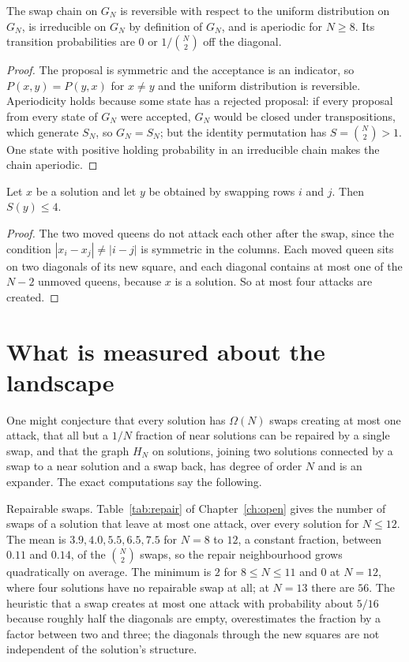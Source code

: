 \begin{lemma}
\label{lem:chainfacts}
The swap chain on $G_N$ is reversible with respect to the uniform distribution on $G_N$, is irreducible on $G_N$ by definition of $G_N$, and is aperiodic for $N \ge 8$. Its transition probabilities are $0$ or $1 / \binom{N}{2}$ off the diagonal.
\end{lemma}

\begin{proof}
The proposal is symmetric and the acceptance is an indicator, so $P(x, y) = P(y, x)$ for $x \ne y$ and the uniform distribution is reversible. Aperiodicity holds because some state has a rejected proposal: if every proposal from every state of $G_N$ were accepted, $G_N$ would be closed under transpositions, which generate $S_N$, so $G_N = S_N$; but the identity permutation has $S = \binom{N}{2} > 1$. One state with positive holding probability in an irreducible chain makes the chain aperiodic.
\end{proof}

\begin{lemma}
\label{lem:four}
Let $x$ be a solution and let $y$ be obtained by swapping rows $i$ and $j$. Then $S(y) \le 4$.
\end{lemma}

\begin{proof}
The two moved queens do not attack each other after the swap, since the condition $|x_i - x_j| \ne |i - j|$ is symmetric in the columns. Each moved queen sits on two diagonals of its new square, and each diagonal contains at most one of the $N - 2$ unmoved queens, because $x$ is a solution. So at most four attacks are created.
\end{proof}

\section{What is measured about the landscape}

One might conjecture that every solution has $\Omega(N)$ swaps creating at most one attack, that all but a $1/N$ fraction of near solutions can be repaired by a single swap, and that the graph $H_N$ on solutions, joining two solutions connected by a swap to a near solution and a swap back, has degree of order $N$ and is an expander. The exact computations say the following.

Repairable swaps. Table~\ref{tab:repair} of Chapter~\ref{ch:open} gives the number of swaps of a solution that leave at most one attack, over every solution for $N \le 12$. The mean is $3.9, 4.0, 5.5, 6.5, 7.5$ for $N = 8$ to $12$, a constant fraction, between $0.11$ and $0.14$, of the $\binom{N}{2}$ swaps, so the repair neighbourhood grows quadratically on average. The minimum is $2$ for $8 \le N \le 11$ and $0$ at $N = 12$, where four solutions have no repairable swap at all; at $N = 13$ there are $56$. The heuristic that a swap creates at most one attack with probability about $5/16$ because roughly half the diagonals are empty, overestimates the fraction by a factor between two and three; the diagonals through the new squares are not independent of the solution's structure.

